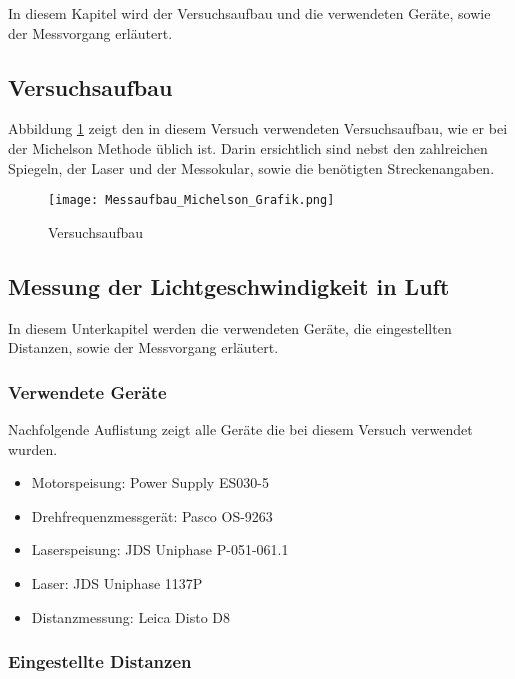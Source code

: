 In diesem Kapitel wird der Versuchsaufbau und die verwendeten Geräte, sowie der Messvorgang erläutert.

\subsection{Versuchsaufbau}

Abbildung \ref{fig:Versuchaufbau} zeigt den in diesem Versuch verwendeten Versuchsaufbau, wie er bei der Michelson Methode üblich ist. Darin ersichtlich sind nebst den zahlreichen Spiegeln, der Laser und der Messokular, sowie die benötigten Streckenangaben.

\begin{figure}[htb]
\texttt{[image: Messaufbau\_Michelson\_Grafik.png]}
\caption{Versuchsaufbau}
\label{fig:Versuchaufbau}
\end{figure}

\subsection{Messung der Lichtgeschwindigkeit in Luft}

In diesem Unterkapitel werden die verwendeten Geräte, die eingestellten Distanzen, sowie der Messvorgang erläutert.

\subsubsection{Verwendete Geräte}

Nachfolgende Auflistung zeigt alle Geräte die bei diesem Versuch verwendet wurden.

\begin{itemize}
\item Motorspeisung: Power Supply ES030-5
\item Drehfrequenzmessgerät: Pasco OS-9263
\item Laserspeisung: JDS Uniphase P-051-061.1
\item Laser: JDS Uniphase 1137P
\item Distanzmessung: Leica Disto D8
\end{itemize}

\subsubsection{Eingestellte Distanzen}

